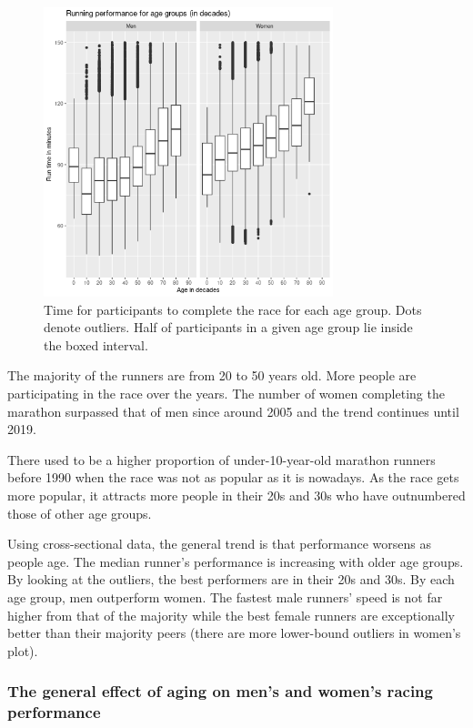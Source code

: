 \documentclass[12pt]{article}
\begin{document}
\begin{figure}[ht]
	\centering
	\includegraphics[width = 0.75\textwidth]
	{../figure/boxplot_runtime_age-1.png}
	\caption{
		Time for participants to complete the race for each age group.
		Dots denote outliers. Half of participants in a given age group
		lie inside the boxed interval.
	}
	\label{box-plot}
\end{figure}

The majority of the runners are from 20 to 50 years old.
More people are participating in the race over the years.
The number of women completing the marathon surpassed that of men since
around 2005 and the trend continues until 2019.

There used to be a higher proportion of under-10-year-old marathon
runners before 1990 when the race was not as popular as it is nowadays.
As the race gets more popular, it attracts more people in their 20s and 30s
who have outnumbered those of other age groups.

Using cross-sectional data, the general trend is that performance worsens as
people age. The median runner's performance is increasing with older age groups.
By looking at the outliers, the best performers are in their 20s and 30s.
By each age group, men outperform women.
The fastest male runners' speed is not far higher from that of the majority
while the best female runners are exceptionally better than their majority
peers (there are more lower-bound outliers in women's plot).

\subsubsection*{The general effect of aging on
	men's and women's racing performance}
\end{document}
